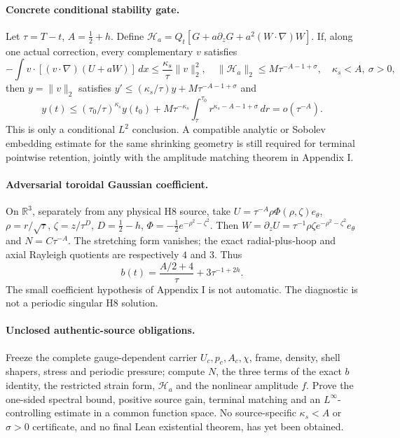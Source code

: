 \paragraph{Concrete conditional stability gate.}
Let $\tau=T-t$, $A=\tfrac12+h$. Define
$\mathcal H_a=Q_t[G+a\partial_zG+a^2(W\cdot\nabla)W]$.
If, along one actual correction, every complementary $v$ satisfies
\[
-\int v\cdot[(v\cdot\nabla)(U+aW)]\,dx
\le \frac{\kappa_s}{\tau}\|v\|_2^2,\quad
\|\mathcal H_a\|_2\le M\tau^{-A-1+\sigma},
\quad\kappa_s<A,\ \sigma>0,
\]
then $y=\|v\|_2$ satisfies
$y'\le(\kappa_s/\tau)y+M\tau^{-A-1+\sigma}$ and
\[
y(t)\le(\tau_0/\tau)^{\kappa_s}y(t_0)
+M\tau^{-\kappa_s}\int_{\tau}^{\tau_0}
r^{\kappa_s-A-1+\sigma}\,dr
=o(\tau^{-A}).
\]
This is only a conditional $L^2$ conclusion. A compatible analytic
or Sobolev embedding estimate for the same shrinking geometry is still
required for terminal pointwise retention, jointly with the amplitude
matching theorem in Appendix I.

\paragraph{Adversarial toroidal Gaussian coefficient.}
On $\mathbb R^3$, separately from any physical H8 source, take
$U=\tau^{-A}\rho\Phi(\rho,\zeta)e_\theta$,
$\rho=r/\sqrt\tau$, $\zeta=z/\tau^D$,
$D=\tfrac12-h$, $\Phi=-\tfrac12e^{-\rho^2-\zeta^2}$.
Then $W=\partial_zU=\tau^{-1}\rho\zeta
e^{-\rho^2-\zeta^2}e_\theta$ and $N=C\tau^{-A}$.
The stretching form vanishes; the exact radial-plus-hoop and axial
Rayleigh quotients are respectively $4$ and $3$. Thus
\[
\boxed{b(t)=\frac{A/2+4}{\tau}+3\tau^{-1+2h}.}
\]
The small coefficient hypothesis of Appendix I is not automatic.
The diagnostic is not a periodic singular H8 solution.

\paragraph{Unclosed authentic-source obligations.}
Freeze the complete gauge-dependent carrier $U_c,p_c,A_c,\chi$,
frame, density, shell shapers, stress and periodic pressure; compute
$N$, the three terms of the exact $b$ identity, the restricted strain
form, $\mathcal H_a$ and the nonlinear amplitude $f$. Prove the one-sided
spectral bound, positive source gain, terminal matching and an
$L^\infty$-controlling estimate in a common function space.
No source-specific $\kappa_s<A$ or $\sigma>0$ certificate, and no final
Lean existential theorem, has yet been obtained.